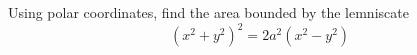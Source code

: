 Using polar coordinates, find the area bounded by the lemniscate
\[
(x^2 + y^2)^2 = 2a^2(x^2 - y^2)
\]
